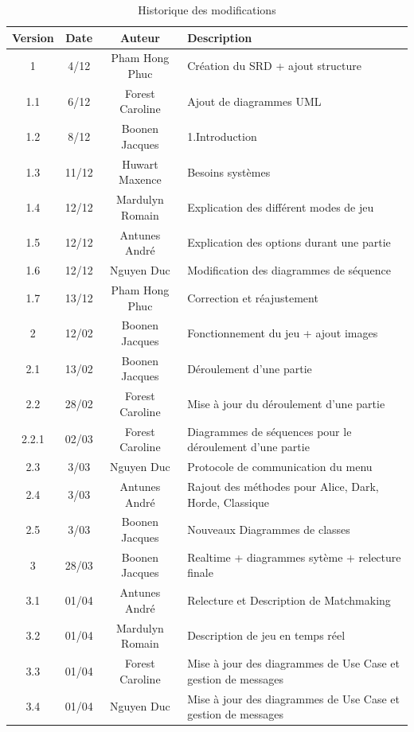 \documentclass[10pt, a4paper]{article}
\begin{document}
		\begin{table}[h!]

			\centering

			\begin{tabular}{|c|c|c|p{50mm}|}
				\hline
				 \textbf{Version} & \textbf{Date} & \textbf{Auteur}  & \textbf{Description} \\ \hline
				 1 & 4/12 & Pham Hong Phuc & Création du SRD + ajout structure\\
				 1.1 & 6/12 & Forest Caroline & Ajout de diagrammes UML\\
				 1.2 & 8/12 & Boonen Jacques & 1.Introduction\\
				 1.3 & 11/12 & Huwart Maxence & Besoins systèmes\\
				 1.4 & 12/12 & Mardulyn Romain & Explication des différent modes de jeu\\
				 1.5 & 12/12 & Antunes André & Explication des options durant une partie\\
         1.6 & 12/12 & Nguyen Duc & Modification des diagrammes de séquence\\
         1.7 & 13/12 & Pham Hong Phuc & Correction et réajustement \\ \hline
				 2 & 12/02 & Boonen Jacques & Fonctionnement du jeu + ajout images \\
				 2.1 & 13/02 & Boonen Jacques & Déroulement d'une partie \\
				 2.2 & 28/02 & Forest Caroline & Mise à jour du déroulement d'une partie \\
				 2.2.1 & 02/03 & Forest Caroline & Diagrammes de séquences pour le déroulement d'une partie \\
				 2.3 & 3/03 & Nguyen Duc & Protocole de communication du menu \\
				 2.4 & 3/03 & Antunes André & Rajout des méthodes pour Alice, Dark, Horde, Classique \\
				 2.5 & 3/03 & Boonen Jacques & Nouveaux Diagrammes de classes \\ \hline
				 3 & 28/03 & Boonen Jacques & Realtime + diagrammes sytème + relecture finale \\
				 3.1 & 01/04 & Antunes André & Relecture et Description de Matchmaking\\
				 3.2 & 01/04 & Mardulyn Romain & Description de jeu en temps réel\\
				 3.3 & 01/04 & Forest Caroline & Mise à jour des diagrammes de Use Case et gestion de messages\\
				 3.4 & 01/04 & Nguyen Duc & Mise à jour des diagrammes de Use Case et gestion de messages\\
				\hline
\end{tabular}
			\caption*{Historique des modifications}
			\end{table}
\clearpage
\end{document}
